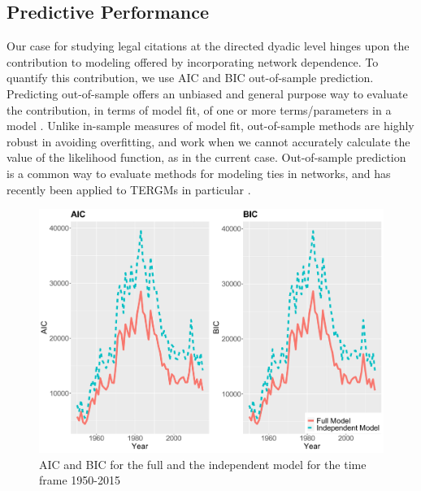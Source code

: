 \documentclass[headsepline=true, abstracton]{scrartcl}
\begin{document}

  
  
\subsection{Predictive Performance}

Our case for studying legal citations at the directed dyadic level hinges upon the contribution to modeling offered by incorporating network dependence. To quantify this contribution, we use AIC and BIC out-of-sample prediction. Predicting out-of-sample offers an unbiased and general purpose way to evaluate the contribution, in terms of model fit, of one or more terms/parameters in a model \citep{jensen2000multiple,ward2010perils}. Unlike in-sample measures of model fit, out-of-sample methods are highly robust in avoiding overfitting, and work when we cannot accurately calculate the value of the likelihood function, as in the current case. Out-of-sample prediction is a common way to evaluate methods for modeling ties in networks, and has recently been applied to TERGMs in particular \citep{desmarais2013forecasting,cranmer2017can}.

  \begin{figure}[t]
\includegraphics[width=15cm]{SCC_AIC_BIC}
\caption{AIC and BIC for the full and the independent model for the time frame 1950-2015 }
 \label{AIC_BIC}
\vspace{-.25cm}
\end{figure}  
\end{document}
